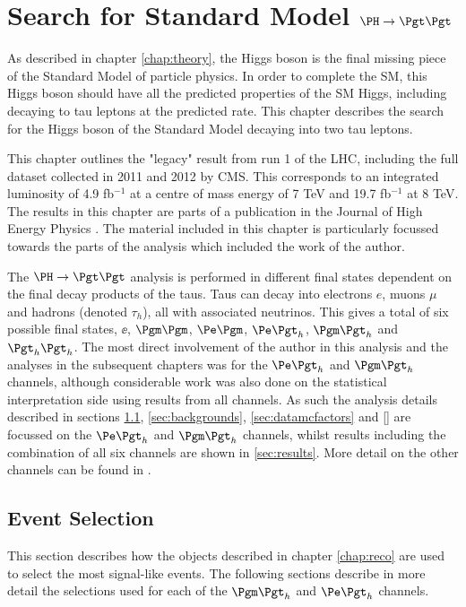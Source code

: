 \chapter{Search for Standard Model $\PH \to \Pgt\Pgt$}
\label{chap:httSM}

As described in chapter \ref{chap:theory}, the Higgs boson is the final missing 
piece of the Standard Model of particle physics. In order to complete the
\ac{SM}, this Higgs boson should have all the predicted properties of the
\ac{SM} Higgs, including decaying to tau leptons at the predicted rate. This
chapter describes the search for the Higgs boson of the Standard Model 
decaying into two tau leptons.

This chapter outlines the "legacy" result from run 1 of the \ac{LHC}, including the
full dataset collected in 2011 and 2012 by CMS. This corresponds to an
integrated luminosity of 4.9 fb$^{-1}$ at a centre of mass energy of 7 TeV and
19.7 fb$^{-1}$ at 8 TeV. The results in this chapter are parts of a publication 
in the Journal of High Energy Physics \cite{HIG-13-004}. The material included 
in this chapter is particularly focussed towards the parts of the analysis which 
included the work of the author. 

The $\PH \to \Pgt\Pgt$ analysis is performed in different final states dependent
on the final decay products of the taus. Taus can decay into electrons $e$,
muons $\mu$ and hadrons (denoted $\tau_{h}$), all with associated neutrinos.
This gives a total of six possible final states, $\ee$, $\mumu$, $\emu$,
$\etau$, $\mutau$ and $\tautau$. The most direct involvement of the author in this
analysis and the analyses in the subsequent chapters was for the $\etau$ and
$\mutau$ channels, although considerable work was also done on the statistical
interpretation side using results from all channels. 
As such the analysis details described in sections \ref{sec:eventSelection},
\ref{sec:backgrounds}, \ref{sec:datamcfactors} and \ref{} are focussed on the
$\etau$ and $\mutau$ channels, whilst results including the combination of all
six channels are shown in \ref{sec:results}. More detail on the other channels
can be found in \cite{HIG-13-004}. 

\section{Event Selection}
\label{sec:eventSelection}

This section describes how the objects described in chapter
\ref{chap:reco} are used to select the most signal-like events. 
The following sections describe in more detail the selections
used for each of the $\mutau$ and $\etau$ channels.

